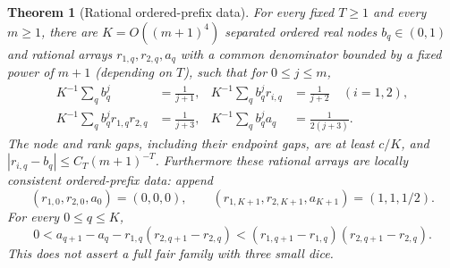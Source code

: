 \documentclass[11pt]{article}
\newtheorem{theorem}{Theorem}
\begin{document}
\begin{theorem}[Rational ordered-prefix data]\label{ranks}
For every fixed $T\ge1$ and every $m\ge1$, there are
$K=O((m+1)^4)$ separated ordered real nodes $b_q\in(0,1)$ and rational
arrays $r_{1,q},r_{2,q},a_q$ with a common denominator bounded by a
fixed power of $m+1$ (depending on $T$), such that for $0\le j\le m$,
\begin{align*}
 K^{-1}\sum_q b_q^j&=\frac1{j+1},&
 K^{-1}\sum_q b_q^j r_{i,q}&=\frac1{j+2}\quad(i=1,2),\\
 K^{-1}\sum_q b_q^j r_{1,q}r_{2,q}&=\frac1{j+3},&
 K^{-1}\sum_q b_q^j a_q&=\frac1{2(j+3)}.
\end{align*}
The node and rank gaps, including their endpoint gaps, are at least
$c/K$, and $|r_{i,q}-b_q|\le C_T(m+1)^{-T}$.
Furthermore these rational arrays are locally consistent ordered-prefix
data: append
\[
 (r_{1,0},r_{2,0},a_0)=(0,0,0),\qquad
 (r_{1,K+1},r_{2,K+1},a_{K+1})=(1,1,1/2).
\]
For every $0\le q\le K$,
\begin{equation}\label{area}
 0<a_{q+1}-a_q-r_{1,q}(r_{2,q+1}-r_{2,q})
 <(r_{1,q+1}-r_{1,q})(r_{2,q+1}-r_{2,q}).
\end{equation}
This does not assert a full fair family with three small dice.
\end{theorem}
\end{document}
